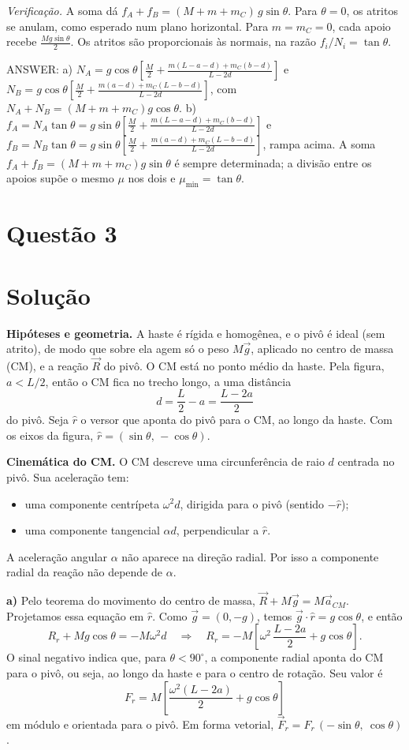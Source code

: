 \documentclass{article}%
\begin{document}
\emph{Verificação.} A soma dá $f_A+f_B=(M+m+m_C)\,g\sin\theta$. Para $\theta=0$, os atritos se anulam, como esperado num plano horizontal. Para $m=m_C=0$, cada apoio recebe $\tfrac{Mg\sin\theta}{2}$. Os atritos são proporcionais às normais, na razão $f_i/N_i=\tan\theta$.

\medskip
ANSWER: a) $N_A=g\cos\theta\left[\frac{M}{2}+\frac{m(L-a-d)+m_C(b-d)}{L-2d}\right]$ e $N_B=g\cos\theta\left[\frac{M}{2}+\frac{m(a-d)+m_C(L-b-d)}{L-2d}\right]$, com $N_A+N_B=(M+m+m_C)g\cos\theta$. b) $f_A=N_A\tan\theta=g\sin\theta\left[\frac{M}{2}+\frac{m(L-a-d)+m_C(b-d)}{L-2d}\right]$ e $f_B=N_B\tan\theta=g\sin\theta\left[\frac{M}{2}+\frac{m(a-d)+m_C(L-b-d)}{L-2d}\right]$, rampa acima. A soma $f_A+f_B=(M+m+m_C)g\sin\theta$ é sempre determinada; a divisão entre os apoios supõe o mesmo $\mu$ nos dois e $\mu_{\min}=\tan\theta$.%
\newpage%
\section*{Questão 3}

\section*{Solução}

\textbf{Hipóteses e geometria.} A haste é rígida e homogênea, e o pivô é ideal (sem atrito), de modo que sobre ela agem só o peso $M\vec g$, aplicado no centro de massa (CM), e a reação $\vec R$ do pivô. O CM está no ponto médio da haste. Pela figura, $a<L/2$, então o CM fica no trecho longo, a uma distância
\[
d=\frac{L}{2}-a=\frac{L-2a}{2}
\]
do pivô. Seja $\hat r$ o versor que aponta do pivô para o CM, ao longo da haste. Com os eixos da figura, $\hat r=(\sin\theta,\,-\cos\theta)$.

\textbf{Cinemática do CM.} O CM descreve uma circunferência de raio $d$ centrada no pivô. Sua aceleração tem:
\begin{itemize}
\item uma componente centrípeta $\omega^2 d$, dirigida para o pivô (sentido $-\hat r$);
\item uma componente tangencial $\alpha d$, perpendicular a $\hat r$.
\end{itemize}
A aceleração angular $\alpha$ não aparece na direção radial. Por isso a componente radial da reação não depende de $\alpha$.

\textbf{a)} Pelo teorema do movimento do centro de massa, $\vec R+M\vec g=M\vec a_{CM}$. Projetamos essa equação em $\hat r$. Como $\vec g=(0,-g)$, temos $\vec g\cdot\hat r=g\cos\theta$, e então
\[
R_r+Mg\cos\theta=-M\omega^2 d
\quad\Longrightarrow\quad
R_r=-M\left[\omega^2\,\frac{L-2a}{2}+g\cos\theta\right].
\]
O sinal negativo indica que, para $\theta<90^\circ$, a componente radial aponta do CM para o pivô, ou seja, ao longo da haste e para o centro de rotação. Seu valor é
\[
\boxed{F_r=M\left[\frac{\omega^2(L-2a)}{2}+g\cos\theta\right]}
\]
em módulo e orientada para o pivô. Em forma vetorial, $\vec F_r=F_r\,(-\sin\theta,\ \cos\theta)$.
\end{document}
